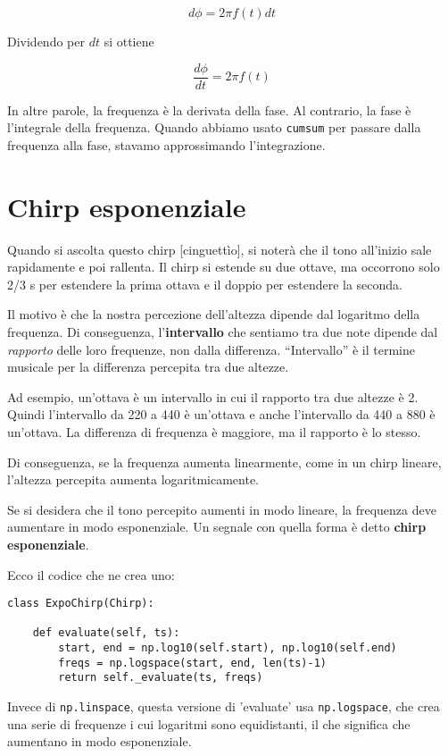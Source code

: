 \documentclass[12pt]{book} \usepackage[width=5.5in,height=8.5in, hmarginratio=3:2,vmarginratio=1:1]{geometry}
\begin{document}
%
\[ d\phi = 2 \pi f(t) dt \] 

%
Dividendo per $dt$ si ottiene

%
\[ \frac{d\phi}{dt} = 2 \pi f(t) \] 

%
In altre parole, la frequenza è la derivata della fase. Al contrario, la fase è l'integrale della frequenza. Quando abbiamo usato {\tt cumsum} per passare dalla frequenza alla fase, stavamo approssimando l'integrazione.

\section{Chirp esponenziale} 

Quando si ascolta questo chirp [cinguettìo], si noterà che il tono all'inizio sale rapidamente e poi rallenta. Il chirp si estende su due ottave, ma occorrono solo 2/3 s per estendere la prima ottava e il doppio per estendere la seconda.

Il motivo è che la nostra percezione dell'altezza dipende dal logaritmo della frequenza. Di conseguenza, l'{\bf intervallo} che sentiamo tra due note dipende dal {\em rapporto} delle loro frequenze, non dalla differenza. ``Intervallo'' è il termine musicale per la differenza percepita tra due altezze.

Ad esempio, un'ottava è un intervallo in cui il rapporto tra due altezze è 2. Quindi l'intervallo da 220 a 440 è un'ottava e anche l'intervallo da 440 a 880 è un'ottava. La differenza di frequenza è maggiore, ma il rapporto è lo stesso.

Di conseguenza, se la frequenza aumenta linearmente, come in un chirp lineare, l'altezza percepita aumenta logaritmicamente.

Se si desidera che il tono percepito aumenti in modo lineare, la frequenza deve aumentare in modo esponenziale. Un segnale con quella forma è detto {\bf chirp esponenziale}.

Ecco il codice che ne crea uno:

\begin{verbatim} 
class ExpoChirp(Chirp):

    def evaluate(self, ts):
        start, end = np.log10(self.start), np.log10(self.end)
        freqs = np.logspace(start, end, len(ts)-1)
        return self._evaluate(ts, freqs)
 \end{verbatim} 

Invece di {\tt np.linspace}, questa versione di 'evaluate' usa {\tt np.logspace}, che crea una serie di frequenze i cui logaritmi sono equidistanti, il che significa che aumentano in modo esponenziale.
\end{document}
